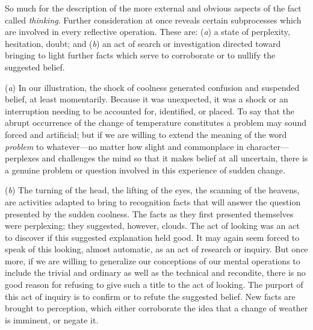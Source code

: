 \documentclass[showtrims,ustradepaper]{memoir}
\begin{document}
So much for the description of the more external and obvious aspects of
the fact called \emph{thinking}. Further consideration at once reveals
certain subprocesses which are involved in every reflective operation.
These are: (\emph{a}) a state of perplexity, hesitation, doubt; and
(\emph{b}) an act of search or investigation directed toward bringing to
light further facts which serve to corroborate or to nullify the
suggested belief.


(\emph{a}) In our illustration, the shock of coolness generated
confusion and suspended belief, at least momentarily. Because it was
unexpected, it was a shock or an interruption needing to be accounted
for, identified, or placed. To say that the abrupt occurrence of the
change of temperature constitutes a problem may sound forced and
artificial; but if we are willing to extend the meaning of the word
\emph{problem} to whatever---no matter how slight and commonplace in
character---perplexes and challenges the mind so that it makes belief at
all uncertain, there is a genuine problem or question involved in this
experience of sudden change.


(\emph{b}) The turning of the head, the lifting of the eyes, the
scanning of the heavens, are activities adapted to bring to recognition
facts that will answer the question presented by the sudden coolness.
The facts as
they
first presented themselves were perplexing; they suggested, however,
clouds. The act of looking was an act to discover if this suggested
explanation held good. It may again seem forced to speak of this
looking, almost automatic, as an act of research or inquiry. But once
more, if we are willing to generalize our conceptions of our mental
operations to include the trivial and ordinary as well as the technical
and recondite, there is no good reason for refusing to give such a title
to the act of looking. The purport of this act of inquiry is to confirm
or to refute the suggested belief. New facts are brought to perception,
which either corroborate the idea that a change of weather is imminent,
or negate it.

\end{document}

